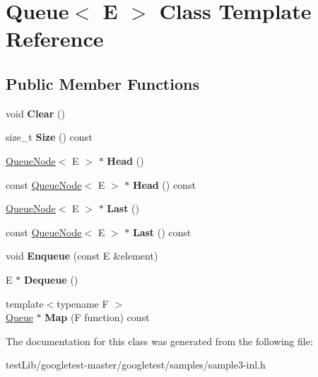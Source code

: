 \hypertarget{classQueue}{}\section{Queue$<$ E $>$ Class Template Reference}
\label{classQueue}
\subsection*{Public Member Functions}
\begin{DoxyCompactItemize}
\item 
\mbox{\label{classQueue_acfdd5f9f7e936ca30dcf877370ef9510}} 
void {\bfseries Clear} ()
\item 
\mbox{\label{classQueue_abc4d78b5f66041011c5590bf703847b0}} 
size\+\_\+t {\bfseries Size} () const
\item 
\mbox{\label{classQueue_a71aa0154ef75bb87a53b6af1829fcd5e}} 
\hyperlink{classQueueNode}{Queue\+Node}$<$ E $>$ $\ast$ {\bfseries Head} ()
\item 
\mbox{\label{classQueue_a6c906075e0ad2d1f0634990aa106395e}} 
const \hyperlink{classQueueNode}{Queue\+Node}$<$ E $>$ $\ast$ {\bfseries Head} () const
\item 
\mbox{\label{classQueue_a430aca3d3b9f5fd588b215028d134b74}} 
\hyperlink{classQueueNode}{Queue\+Node}$<$ E $>$ $\ast$ {\bfseries Last} ()
\item 
\mbox{\label{classQueue_a7c8c2c64700dfe1df8bf266572cf101a}} 
const \hyperlink{classQueueNode}{Queue\+Node}$<$ E $>$ $\ast$ {\bfseries Last} () const
\item 
\mbox{\label{classQueue_abaa2e7175457307bca74f5562cbdaaa9}} 
void {\bfseries Enqueue} (const E \&element)
\item 
\mbox{\label{classQueue_a434d465001c3078e999f7a89a8af84c0}} 
E $\ast$ {\bfseries Dequeue} ()
\item 
\mbox{\label{classQueue_a904a696292fc593adc6fd21fb229d760}} 
{\footnotesize template$<$typename F $>$ }\\\hyperlink{classQueue}{Queue} $\ast$ {\bfseries Map} (F function) const
\end{DoxyCompactItemize}


The documentation for this class was generated from the following file\+:\begin{DoxyCompactItemize}
\item 
test\+Lib/googletest-\/master/googletest/samples/sample3-\/inl.\+h\end{DoxyCompactItemize}
